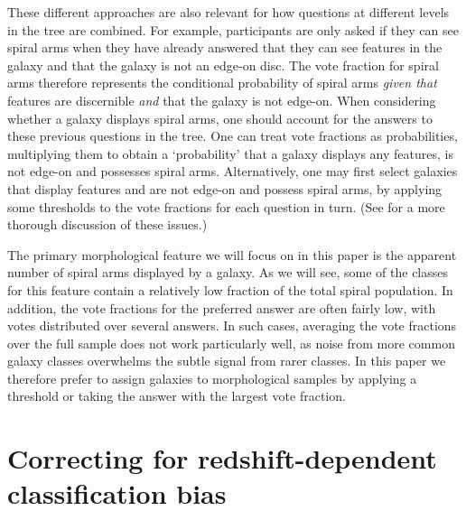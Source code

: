 \documentclass[useAMS,usenatbib]{mn2e}
\begin{document}
These different approaches are also relevant for how questions at different levels in the tree are combined.  For example, participants are only asked if they can see spiral arms when they have already answered that they can see features in the galaxy and that the galaxy is not an edge-on disc.  The vote fraction for spiral arms therefore represents the conditional probability of spiral arms \emph{given that} features are discernible \emph{and} that the galaxy is not edge-on. When considering whether a galaxy displays spiral arms, one should account for the answers to these previous questions in the tree.  One can treat vote fractions as probabilities, multiplying them to obtain a `probability' that a galaxy displays any features, is not edge-on and possesses spiral arms.  Alternatively, one may first select galaxies that display features and are not edge-on and possess spiral arms, by applying some thresholds to the vote fractions for each question in turn. (See \citealt{Casteels_13} for a more thorough discussion of these issues.)

The primary morphological feature we will focus on in this paper is the apparent number of spiral arms displayed by a galaxy.
As we will see, some of the classes for this feature contain a relatively low fraction of the total spiral population.  In addition, the vote fractions for the preferred answer are often fairly low, with votes distributed over several answers.
In such cases, averaging the vote fractions over the full sample does not work particularly well, as noise from more common galaxy classes overwhelms the subtle signal from rarer classes.  In this paper we therefore prefer to assign galaxies to morphological samples by applying a threshold or taking the answer with the largest vote fraction.



\section{Correcting for redshift-dependent classification bias}
\label{sec:biases}
\end{document}
